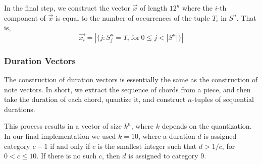 \documentclass[twocolumn,dvipsnames]{article}
\newcommand\len[1]{\left|#1\right|}
\begin{document}
In the final step, we construct the vector $\vec{x}$ of length $12^n$ where the $i$-th component of $\vec{x}$ is equal to the number of occurrences of the tuple $T_i$ in $S^n$.
That is,
\begin{equation*}
    \vec{x_i} = \len{\{ j : S_j^n = T_i \mathrm{\ for\ } 0 \leq j < \len{S^n} \}}
\end{equation*}

\subsubsection{Duration Vectors}
The construction of duration vectors is essentially the same as the
construction of note vectors.
In short, we extract the sequence of chords from a piece,
and then take the duration of each chord, quantize it,
and construct $n$-tuples of sequential durations.

This process results in a vector of size $k^n$, where $k$ depends on the quantization.
In our final implementation we used $k = 10$,
where a duration $d$ is assigned category $c - 1$ if and only if $c$ is the smallest integer such that $d > 1 / c$, for $0 < c \leq 10$.
If there is no such $c$, then $d$ is assigned to category $9$.
\end{document}
